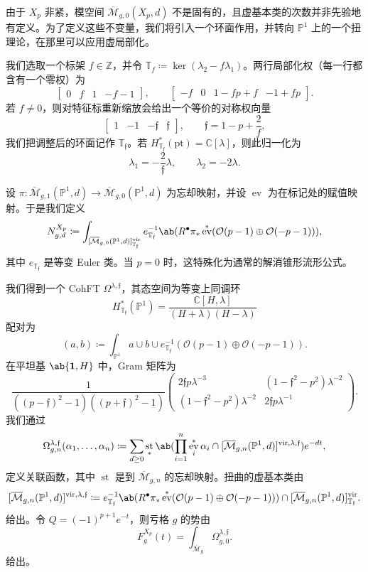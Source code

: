 \documentclass{amsart}
\theoremstyle{definition}
\theoremstyle{remark}
\theoremstyle{plain}
\theoremstyle{definition}
\theoremstyle{remark}
\newcommand{\C}{\mathbb{C}}
\newcommand{\Z}{\mathbb{Z}}
\renewcommand{\P}{\mathbb{P}}
\newcommand{\Mbar}{\overline{\mathcal{M}}}
\newcommand{\mc}[1]{\mathcal{#1}}
\newcommand{\T}{\mathbb{T}}
\newcommand{\mf}[1]{\mathfrak{#1}}
\newcommand{\mr}[1]{\mathrm{#1}}
\newcommand{\1}{\mathbf{1}}
\newcommand{\2}{\mathbf{2}}
\newcommand{\3}{\mathbf{3}}
\newcommand{\vir}{\mr{vir}}
\DeclareMathOperator{\ev}{ev}
\DeclareMathOperator{\st}{st}
\begin{document}
由于 \(X_p\) 非紧，模空间 \(\Mbar_{g,0}(X_p,d)\) 不是固有的，且虚基本类的次数并非先验地有定义。为了定义这些不变量，我们将引入一个环面作用，并转向 \(\P^1\) 上的一个扭理论，在那里可以应用虚局部化。

我们选取一个标架 \(f \in \Z\)，并令 \(\T_f \coloneqq \ker(\lambda_2 - f\lambda_1)\)。两行局部化权（每一行都含有一个零权）为
\[ \begin{bmatrix} 0 & f & 1 & -f-1 \end{bmatrix}, \qquad \begin{bmatrix} -f & 0 & 1-fp+f & -1+fp \end{bmatrix}. \]
若 \(f \neq 0\)，则对特征标重新缩放会给出一个等价的对称权向量
\[ \begin{bmatrix} 1 & -1 & -\mf{f} & \mf{f} \end{bmatrix}, \qquad \mf{f} = 1-p+\frac{2}{f}, \]
我们把调整后的环面记作 \(\T_{\mf{f}}\)。若 \(H^*_{\T_{\mf{f}}}(\mr{pt}) = \C[\lambda]\)，则此归一化为
\[ \lambda_1 = -\frac{2}{\mf{f}}\lambda, \qquad \lambda_2 = -2\lambda. \]

设 \(\pi \colon \Mbar_{g,1}(\P^1,d) \to \Mbar_{g,0}(\P^1,d)\) 为忘却映射，并设 \(\ev\) 为在标记处的赋值映射。于是我们定义
\[ N^{X_p}_{g,d} \coloneqq \int_{[\Mbar_{g,0}(\P^1,d)]^{\vir}_{\T_{\mf{f}}}} e_{\T_{\mf{f}}}^{-1}\ab(R^{\bullet}\pi_* \ev^*(\mc{O}(p-1)\oplus\mc{O}(-p-1))), \]
其中 \(e_{\T_{\mf{f}}}\) 是等变 Euler 类。当 \(p=0\) 时，这特殊化为通常的解消锥形流形公式。

我们得到一个 CohFT \(\Omega^{\lambda,\mf{f}}\)，其态空间为等变上同调环
\[ H^*_{\T_{\mf{f}}}(\P^1) = \frac{\C[H,\lambda]}{(H+\lambda)(H-\lambda)} \]
配对为
\[ (a,b) \coloneqq \int_{\P^1} a \cup b \cup e^{-1}_{\T_{\mf{f}}}(\mc{O}(p-1)\oplus\mc{O}(-p-1)). \]
在平坦基 \(\ab\{\1,H\}\) 中，Gram 矩阵为
\[ \frac{1}{((p-\mf{f})^2-1)((p+\mf{f})^2-1)}\begin{pmatrix} 2\mf{f}p\lambda^{-3} & (1-\mf{f}^2-p^2)\lambda^{-2} \\ (1-\mf{f}^2-p^2)\lambda^{-2} & 2\mf{f}p\lambda^{-1} \end{pmatrix}. \]
我们通过
\[ \Omega^{\lambda,\mf{f}}_{g,n}(\alpha_1,\ldots,\alpha_n) \coloneqq \sum_{d\geq0}\st_*\ab(\prod_{i=1}^n \ev_i^*\alpha_i \cap [\Mbar_{g,n}(\P^1,d)]^{\vir,\lambda,\mf{f}})e^{-dt}, \]
定义关联函数，其中 \(\st\) 是到 \(\Mbar_{g,n}\) 的忘却映射。扭曲的虚基本类由
\[ [\Mbar_{g,n}(\P^1,d)]^{\vir,\lambda,\mf{f}} \coloneqq e^{-1}_{\T_{\mf{f}}}\ab(R^{\bullet}\pi_*\ev^*(\mc{O}(p-1)\oplus\mc{O}(-p-1))) \cap [\Mbar_{g,n}(\P^1,d)]^{\vir}_{\T_{\mf{f}}}. \]
给出。令 \(Q = (-1)^{p+1}e^{-t}\)，则亏格 \(g\) 的势由
\[ F^{X_p}_g(t) = \int_{\Mbar_g} \Omega^{\lambda,\mf{f}}_{g,0}. \]
给出。
\end{document}
